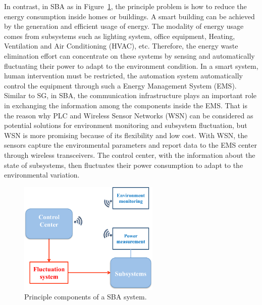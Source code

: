 In contrast, in SBA as in Figure~\ref{fig:I1}, the principle problem is how to reduce the energy consumption inside homes or buildings. A smart building can be achieved by the generation and efficient usage of energy. The modality of energy usage comes from subsystems such as lighting system, office equipment, Heating, Ventilation and Air Conditioning (HVAC), etc. Therefore, the energy waste elimination effort can concentrate on these systems by sensing and automatically fluctuating their power to adapt to the environment condition. In a smart system, human intervention must be restricted, the automation system automatically control the equipment through such a Energy Management System (EMS). Similar to SG, in SBA, the communication infrastructure plays an important role in exchanging the information among the components inside the EMS. That is the reason why PLC and Wireless Sensor Networks (WSN) can be considered as potential solutions for environment monitoring and subsystem fluctuation, but WSN is more promising because of its flexibility and low cost. With WSN, the sensors capture the environmental parameters and report data to the EMS center through wireless transceivers. The control center, with the information about the state of subsystems, then fluctuates their power consumption to adapt to the environmental variation. 
\begin{figure}
\centering
\includegraphics[width=0.6\textwidth]{./chapters/chapter1/images/SBA.pdf} 
\caption{Principle components of a SBA system.} 
\label{fig:I1} 
\end{figure}


